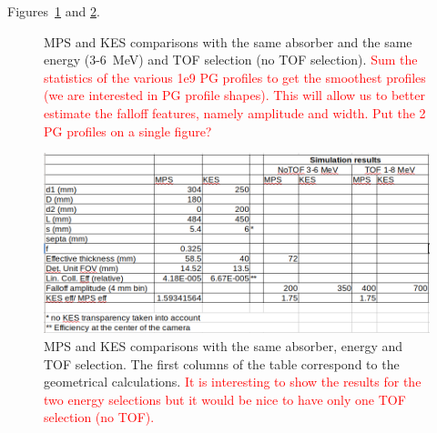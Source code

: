 \documentclass[a4paper,english]{article}
\begin{document}
Figures~\ref{PGprofileFairComp} and \ref{CameraPerformancesFairComp}.

\begin{figure}[!htp]
  \centering
  \quad
  \caption{\label{PGprofileFairComp} MPS and KES comparisons with the same absorber and the same energy (3-6~MeV) and TOF selection (no TOF selection). \textcolor{red}{Sum the statistics of the various 1e9 PG profiles to get the smoothest profiles (we are interested in PG profile shapes). This will allow us to better estimate the falloff features, namely amplitude and width. Put the 2 PG profiles on a single figure?}}
\end{figure}  

\begin{figure}[htp]
  \includegraphics[width=\textwidth]{FairComparison}
  \caption{\label{CameraPerformancesFairComp} MPS and KES comparisons with the same absorber, energy and TOF selection. The first columns of the table correspond to the geometrical calculations. \textcolor{red}{It is interesting to show the results for the two energy selections but it would be nice to have only one TOF selection (no TOF).}}
\end{figure}
\end{document}
